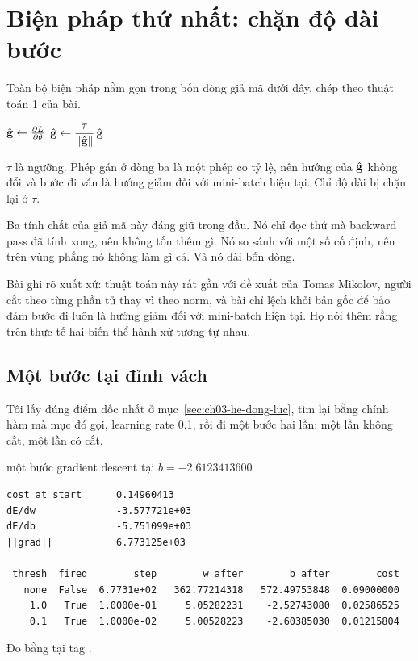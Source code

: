 \section{Biện pháp thứ nhất: chặn độ dài bước}
\label{sec:ch03-clipping}

%
Toàn bộ biện pháp nằm gọn trong bốn dòng giả mã dưới đây, chép theo thuật toán 1
của bài.

\begin{algorithm}[htbp]
  \caption{Clipping theo norm, giả mã theo thuật toán 1 của bài báo}
  \label{alg:ch03-clipping}
  \begin{algorithmic}[1]
    \State \(\hat{\mathbf{g}} \gets \frac{\partial L}{\partial \theta}\)
      \State \(\hat{\mathbf{g}} \gets \dfrac{\tau}{\lVert \hat{\mathbf{g}} \rVert}\, \hat{\mathbf{g}}\)
    \EndIf
  \end{algorithmic}
\end{algorithm}

\(\tau\) là ngưỡng. Phép gán ở dòng ba là một phép co tỷ lệ, nên hướng của
\(\hat{\mathbf{g}}\) không đổi và bước đi vẫn là hướng giảm đối với mini-batch
hiện tại. Chỉ độ dài bị chặn lại ở \(\tau\).

Ba tính chất của giả mã này đáng giữ trong đầu. Nó chỉ đọc thứ mà backward pass
đã tính xong, nên không tốn thêm gì. Nó so sánh với một số cố định, nên trên
vùng phẳng nó không làm gì cả. Và nó dài bốn dòng.

Bài ghi rõ xuất xứ: thuật toán này rất gần với đề xuất của Tomas Mikolov, người
cắt theo từng phần tử thay vì theo norm, và bài chỉ lệch khỏi bản gốc để bảo
đảm bước đi luôn là hướng giảm đối với mini-batch hiện tại. Họ nói thêm rằng
trên thực tế hai biến thể hành xử tương tự nhau.

\subsection*{Một bước tại đỉnh vách}

Tôi lấy đúng điểm dốc nhất ở mục~\ref{sec:ch03-he-dong-luc}, tìm lại bằng chính
hàm mà mục đó gọi, learning rate 0.1, rồi đi một bước hai lần: một lần không
cắt, một lần có cắt.

\begin{measured}{một bước gradient descent tại \(b = -2.6123413600\)}
\begin{verbatim}
cost at start      0.14960413
dE/dw              -3.577721e+03
dE/db              -5.751099e+03
||grad||           6.773125e+03

 thresh  fired        step        w after        b after        cost
   none  False  6.7731e+02   362.77214318   572.49753848  0.09000000
    1.0   True  1.0000e-01     5.05282231    -2.52743080  0.02586525
    0.1   True  1.0000e-02     5.00528223    -2.60385030  0.01215804
\end{verbatim}

Đo bằng  tại tag .
\end{measured}


